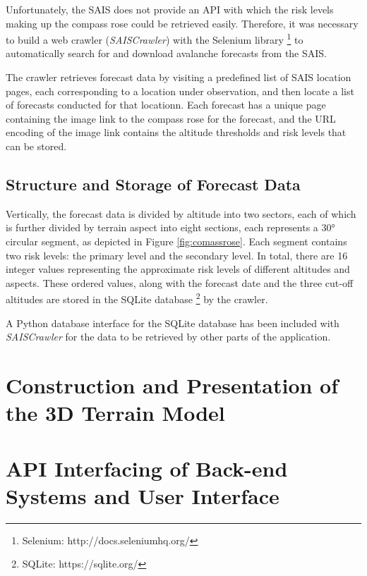 \documentclass[11pt, oneside]{article}
\begin{document}
		Unfortunately, the SAIS does not provide an API with which the risk levels making up the compass rose could be retrieved easily. Therefore, it was necessary to build a web crawler (\textit{SAISCrawler}) with the Selenium library \footnote{Selenium: http://docs.seleniumhq.org/} to automatically search for and download avalanche forecasts from the SAIS.
		
		The crawler retrieves forecast data by visiting a predefined list of SAIS location pages, each corresponding to a location under observation, and then locate a list of forecasts conducted for that locationn. Each forecast has a unique page containing the image link to the compass rose for the forecast, and the URL encoding of the image link contains the altitude thresholds and risk levels that can be stored. 
		
	\subsection{Structure and Storage of Forecast Data}
	
		Vertically, the forecast data is divided by altitude into two sectors, each of which is further divided by terrain aspect into eight sections, each represents a 30° circular segment, as depicted in Figure \ref{fig:comassrose}. Each segment contains two risk levels: the primary level and the secondary level. In total, there are 16 integer values representing the approximate risk levels of different altitudes and  aspects. These ordered values, along with the forecast date and the three cut-off altitudes are stored in the SQLite database \footnote{SQLite: https://sqlite.org/} by the crawler.
		
		A Python database interface for the SQLite database has been included with \textit{SAISCrawler} for the data to be retrieved by other parts of the application.

\section{Construction and Presentation of the 3D Terrain Model}

\section{API Interfacing of Back-end Systems and User Interface} \label{sec:APIServer}
		
		
		

\small{}
\end{document}
